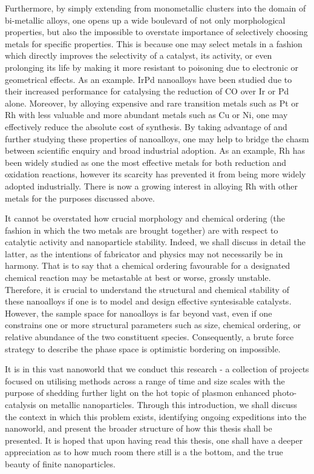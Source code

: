 Furthermore, by simply extending from monometallic clusters into the domain of bi-metallic alloys, one opens up a wide boulevard of not only morphological properties, but also the impossible to overstate importance of selectively choosing metals for specific properties. This is because one may select metals in a fashion which directly improves the selectivity of a catalyst, its activity, or even prolonging its life by making it more resistant to poisoning due to electronic or geometrical effects. As an example. IrPd nanoalloys have been studied due to their increased performance for catalysing the reduction of CO over Ir or Pd alone. Moreover, by alloying expensive and rare transition metals such as Pt or Rh with less valuable and more abundant metals such as Cu or Ni, one may effectively reduce the absolute cost of synthesis. By taking advantage of and further studying these properties of nanoalloys, one may help to bridge the chasm between scientific enquiry and broad industrial adoption. As an example, Rh has been widely studied as one the most effective metals for both reduction and oxidation reactions, however its scarcity has prevented it from being more widely adopted industrially. There is now a growing interest in alloying Rh with other metals for the purposes discussed above.

It cannot be overstated how crucial morphology and chemical ordering (the fashion in which the two metals are brought together) are with respect to catalytic activity and nanoparticle stability. Indeed, we shall discuss in detail the latter, as the intentions of fabricator and physics may not necessarily be in harmony. That is to say that a chemical ordering favourable for a designated chemical reaction may be metastable at best or worse, grossly unstable. Therefore, it is crucial to understand the structural and chemical stability of these nanoalloys if one is to model and design effective syntesisable catalysts. However, the sample space for nanoalloys is far beyond vast, even if one constrains one or more structural parameters such as size, chemical ordering, or relative abundance of the two constituent species. Consequently, a brute force strategy to describe the phase space is optimistic bordering on impossible.

It is in this vast nanoworld that we conduct this research - a collection of projects focused on utilising methods across a range of time and size scales with the purpose of shedding further light on the hot topic of plasmon enhanced photo-catalysis on metallic nanoparticles. Through this introduction, we shall discuss the context in which this problem exists, identifying ongoing expeditions into the nanoworld, and present the broader structure of how this thesis shall be presented. It is hoped that upon having read this thesis, one shall have a deeper appreciation as to how much room there still is a the bottom, and the true beauty of finite nanoparticles.

